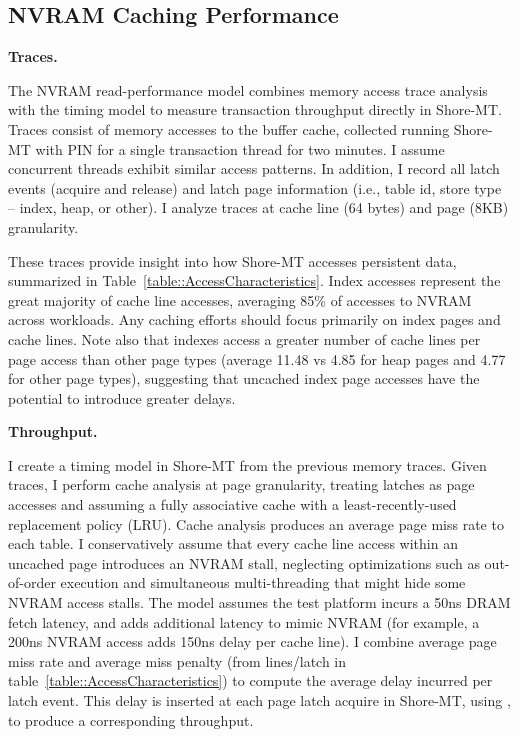 \subsection{NVRAM Caching Performance}
\label{sec:OLTP_eval:Reads:Performance}

\textbf{Traces.}

The NVRAM read-performance model combines memory access trace analysis with the timing model to measure transaction throughput directly in Shore-MT.
Traces consist of memory accesses to the buffer cache, collected running Shore-MT with PIN for a single transaction thread for two minutes.
I assume concurrent threads exhibit similar access patterns.
In addition, I record all latch events (acquire and release) and latch page information (i.e., table id, store type -- index, heap, or other).
I analyze traces at cache line (64 bytes) and page (8KB) granularity.

These traces provide insight into how Shore-MT accesses persistent data, summarized in Table~\ref{table::AccessCharacteristics}.
Index accesses represent the great majority of cache line accesses, averaging 85\% of accesses to NVRAM across workloads.
Any caching efforts should focus primarily on index pages and cache lines.
Note also that indexes access a greater number of cache lines per page access than other page types (average 11.48 vs 4.85 for heap pages and 4.77 for other page types), suggesting that uncached index page accesses have the potential to introduce greater delays.

\textbf{Throughput.}

I create a timing model in Shore-MT from the previous memory traces.
Given traces, I perform cache analysis at page granularity, treating latches as page accesses and assuming a fully associative cache with a least-recently-used replacement policy (LRU).
Cache analysis produces an average page miss rate to each table.
I conservatively assume that every cache line access within an uncached page introduces an NVRAM stall, neglecting optimizations such as out-of-order execution and simultaneous multi-threading that might hide some NVRAM access stalls. 
The model assumes the test platform incurs a 50ns DRAM fetch latency, and adds additional latency to mimic NVRAM (for example, a 200ns NVRAM access adds 150ns delay per cache line).
I combine average page miss rate and average miss penalty (from lines/latch in table~\ref{table::AccessCharacteristics}) to compute the average delay incurred per latch event.
This delay is inserted at each page latch acquire in Shore-MT, using \InPlace, to produce a corresponding throughput.

